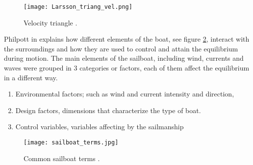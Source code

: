 \begin{figure}[ht]
\centering
  \texttt{[image: Larsson\_triang\_vel.png]}
 \caption{Velocity triangle  \cite{larsonprinciples}. }
\label{vel_triangle}
\end{figure}
 
Philpott  in \cite{philpott1993yacht} explains how different elements of the boat, see figure \ref{sailboat_terms}, interact with the surroundings and how they are used to control and attain the equilibrium during motion. The main elements of the sailboat, including wind, currents and waves were grouped in 3 categories or factors, each of them affect the equilibrium in a different way.
 \begin{enumerate} \label{factorphil}
 \item Environmental factors; such as wind and current intensity and direction,
 \item Design factors, dimensions that characterize the type of boat. 
 \item Control variables, variables affecting by the sailmanship
 \end{enumerate}
 
 \begin{figure}[ht]
\centering
  \texttt{[image: sailboat\_terms.jpg]}
 \caption{Common sailboat terms \cite{sailboat_terms}. }
\label{sailboat_terms}
\end{figure}
 
